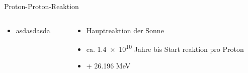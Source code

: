 \documentclass[aspectratio=169,xcolor=dvipsnames,14pt]{beamer}
\begin{document}
{
\begin{frame}{Proton-Proton-Reaktion}
    \begin{columns}
        \begin{column}{0.5\textwidth}
            \begin{itemize}
                \color{LightGrey}
                \item asdasdasda
            \end{itemize}
        \end{column}

        \begin{column}{0.5\textwidth}
            \begin{itemize}
                \color{LightGrey}
                \item Hauptreaktion der Sonne
                \item ca. \num{1.4e10} Jahre bis Start reaktion pro Proton
                \item + \num{26.196} MeV
            \end{itemize}
        \end{column}
    \end{columns}
    

\end{frame}
}
\end{document}
